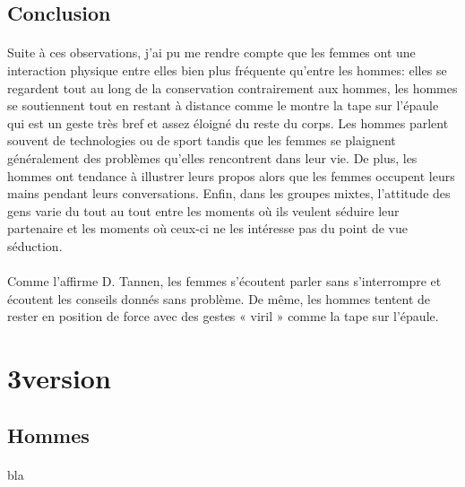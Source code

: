\subsection{Conclusion}

\paragraph{} Suite à ces observations, j'ai pu me rendre compte que les femmes
ont une interaction physique entre elles bien plus fréquente qu'entre les
hommes: elles se regardent tout au long de la conservation contrairement aux
hommes, les hommes se soutiennent tout en restant à distance comme le montre la
tape sur l'épaule qui est un geste très bref et assez éloigné du reste du
corps. Les hommes parlent souvent de technologies ou de sport tandis que les
femmes se plaignent généralement des problèmes qu'elles rencontrent dans leur
vie. De plus, les hommes ont tendance à illustrer leurs propos alors que les
femmes occupent leurs mains pendant leurs conversations. Enfin, dans les
groupes mixtes, l'attitude des gens varie du tout au tout entre les moments où
ils veulent séduire leur partenaire et les moments où ceux-ci ne les intéresse
pas du point de vue séduction.

\paragraph{} Comme l'affirme D. Tannen, les femmes s'écoutent parler sans
s'interrompre et écoutent les conseils donnés sans problème. De même, les
hommes tentent de rester en position de force avec des gestes « viril » comme
la tape sur l'épaule.

\section{3\ieme version}

\paragraph{}

\subsection{Hommes}

\paragraph{}
bla

